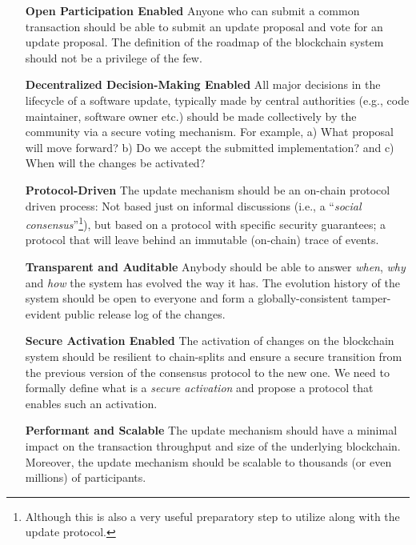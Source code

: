 \begin{itemize}
	\item[\textbf{Open Participation Enabled}] Anyone who can submit a common
	transaction should be able to submit an update proposal and vote for an
	update proposal. The definition of the roadmap of the blockchain system 
	should not be a privilege of the few.
	
	\item[\textbf{Decentralized Decision-Making Enabled}]  All major decisions 
	in the lifecycle of a software update,
	typically made by central authorities (e.g., code maintainer, software
	owner etc.)
	should
	be made
	collectively by the community via a secure voting mechanism. For example, 
	a) What proposal will
	move forward? b) Do we accept the submitted implementation? and c)
	When will the changes be activated?
	
	\item[\textbf{Protocol-Driven}] The update mechanism should be an on-chain
	protocol driven process: Not
	based just on informal discussions (i.e., a ``\emph{social 
	consensus}''\footnote{Although this 
	is
		also a very useful preparatory step to utilize along with the update
		protocol.}), but based on a protocol
	with specific security guarantees; a protocol that will leave behind an
	immutable (on-chain) trace of events.
	
	\item[\textbf{Transparent and Auditable}] Anybody should be able to answer
	\emph{when}, \emph{why} and \emph{how} the system has evolved the way it
	has. The evolution history of the system should be open to everyone and
	form a globally-consistent tamper-evident public release log of the changes.
	
	\item[\textbf{Secure Activation Enabled}] The activation of changes on the 
	blockchain system should be resilient to chain-splits and ensure a secure 
	transition from the previous version of the consensus protocol to the new 
	one. We need to formally define what is a \emph{secure
		activation} and propose a protocol that enables such an activation.
	
	\item[\textbf{Performant and Scalable}] The update mechanism should have a 
	minimal impact on the transaction throughput and size of the underlying
	blockchain. Moreover, the update mechanism should be scalable to thousands
	(or even
	millions) of participants.
	

\end{itemize}
